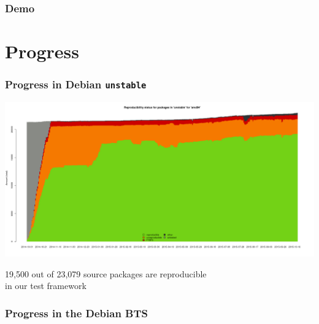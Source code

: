 \documentclass[14pt]{beamer}
\begin{document}
\begin{frame}
 \frametitle{Demo}
\end{frame}

\section{Progress}

\begin{frame}[plain]
 \frametitle{Progress in Debian \texttt{unstable}}
 \begin{center}
  \includegraphics[height=0.5\paperheight]{images/stats_pkg_state.png}

  \small{19,500 out of 23,079 source packages are reproducible \\
    in our test framework}
  \vfill
 \end{center}
\end{frame}


\begin{frame}[plain]
 \frametitle{Progress in the Debian BTS}
\end{frame}
\end{document}
